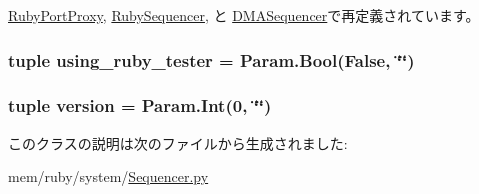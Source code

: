 \hyperlink{classSequencer_1_1RubyPortProxy_acce15679d830831b0bbe8ebc2a60b2ca}{RubyPortProxy}, \hyperlink{classSequencer_1_1RubySequencer_acce15679d830831b0bbe8ebc2a60b2ca}{RubySequencer}, と \hyperlink{classSequencer_1_1DMASequencer_acce15679d830831b0bbe8ebc2a60b2ca}{DMASequencer}で再定義されています。\hypertarget{classSequencer_1_1RubyPort_aa7e78589519412a13754bfc986aece09}{
\subsubsection[{using\_\-ruby\_\-tester}]{\setlength{\rightskip}{0pt plus 5cm}tuple {\bf using\_\-ruby\_\-tester} = Param.Bool(False, \char`\"{}\char`\"{})}}
\label{classSequencer_1_1RubyPort_aa7e78589519412a13754bfc986aece09}
\hypertarget{classSequencer_1_1RubyPort_a76aa01cd80eeb03b381ebe36f17c16b2}{
\subsubsection[{version}]{\setlength{\rightskip}{0pt plus 5cm}tuple {\bf version} = Param.Int(0, \char`\"{}\char`\"{})}}
\label{classSequencer_1_1RubyPort_a76aa01cd80eeb03b381ebe36f17c16b2}


このクラスの説明は次のファイルから生成されました:\begin{DoxyCompactItemize}
\item 
mem/ruby/system/\hyperlink{Sequencer_8py}{Sequencer.py}\end{DoxyCompactItemize}
